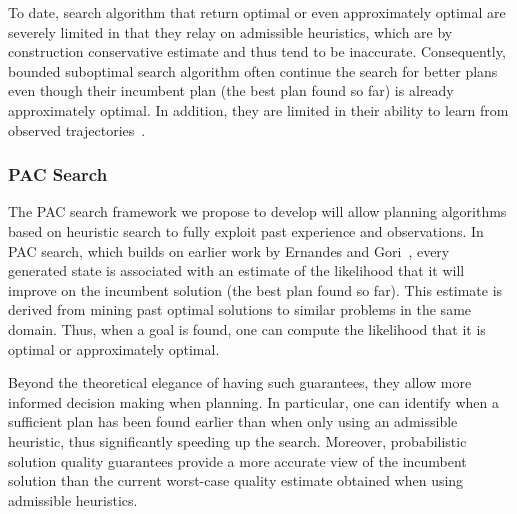 \documentclass[12pt]{article}
\begin{document}


To date, search algorithm that return optimal or even approximately optimal are severely limited in that they relay on admissible heuristics, which are by construction conservative estimate and thus tend to be inaccurate. Consequently, bounded suboptimal search algorithm often continue the search for better plans even though their incumbent plan (the best plan found so far) is already approximately optimal. In addition, they are limited in their ability to learn from observed trajectories~\cite{thayer2011bounded,phillips2012graphs}.

\subsubsection{PAC Search}
The PAC search framework we propose to develop will allow planning algorithms based on heuristic search to fully exploit past experience and observations. In PAC search, which builds on earlier work by Ernandes and Gori~\cite{ernandes2004likely}, every generated state is associated with an estimate of the likelihood that it will improve on the incumbent solution (the best plan found so far). This estimate is derived from mining past optimal solutions to similar problems in the same domain. Thus, when a goal is found, one can compute the likelihood that it is optimal or approximately optimal. 


Beyond the theoretical elegance of having such guarantees, they allow more informed decision making when planning. In particular, one can identify when a sufficient plan has been found earlier than when only using an admissible heuristic, thus significantly speeding up the search. Moreover, probabilistic solution quality guarantees provide a more accurate view of the incumbent solution than the current worst-case quality estimate obtained when using admissible heuristics.  
\end{document}
